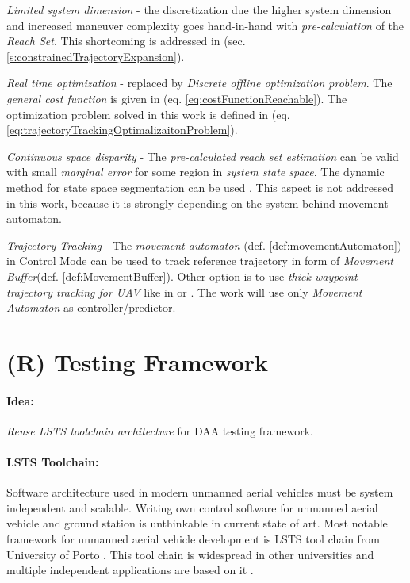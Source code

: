\emph{Limited system dimension} - the discretization due the higher system dimension and  increased maneuver complexity goes hand-in-hand with \emph{pre-calculation} of the \emph{Reach Set}. This shortcoming is addressed in (sec. \ref{s:constrainedTrajectoryExpansion}).

\emph{Real time optimization} -  replaced by \emph{Discrete offline optimization problem}. The \emph{general cost function} is given in (eq. \ref{eq:costFunctionReachable}). The optimization problem solved in this work is defined in (eq. \ref{eq:trajectoryTrackingOptimalizaitonProblem}).

\emph{Continuous space disparity} - The \emph{pre-calculated reach set estimation} can be valid with small \emph{marginal error} for some region in \emph{system state space}. The dynamic method for state space segmentation can be used \cite{takahashi1996reasonable}. This aspect is not addressed in this work, because it is strongly depending on the system behind movement automaton. 

\emph{Trajectory Tracking} - The \emph{movement automaton} (def. \ref{def:movementAutomaton}) in Control Mode can be used to track reference trajectory in form of \emph{Movement Buffer}(def. \ref{def:MovementBuffer}). Other option is to use \emph{thick waypoint trajectory tracking for UAV} like in \cite{kaminer1998trajectory} or \cite{murillo2015generalized}. The work will use only \emph{Movement Automaton} as controller/predictor. 




\section{(R) Testing Framework}\label{s:TestingFrameworkTheory}

\paragraph{Idea:} \emph{Reuse LSTS toolchain architecture} for DAA testing framework.

\paragraph{LSTS Toolchain:} Software architecture used in modern unmanned aerial vehicles must be system independent and scalable. Writing own control software for unmanned aerial vehicle and ground station is unthinkable in current state of art.  Most notable framework for unmanned aerial vehicle development is LSTS tool chain from University of Porto \cite{merani2011underwater}. This tool chain is widespread in other universities and multiple independent applications are based on it \cite{rajan2013towards}.

